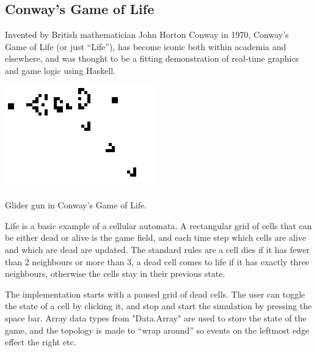 \subsection{Conway's Game of Life}

Invented by British mathematician John Horton Conway in 1970, Conway's Game of Life (or just ``Life''), has become iconic both within academia and elsewhere, and was thought to be a fitting demonstration of real-time graphics and game logic using Haskell. 

\begin{marginfigure}
	\includegraphics{res/conway/conway.png}
	\caption[Glider gun in Conway's Game of Life]{Glider gun in Conway's Game of Life.}
	\label{fig:glidergun}
\end{marginfigure}

Life is a basic example of a cellular automata. A rectangular grid of cells that can be either dead or alive is the game field, and each time step which cells are alive and which are dead are updated. The standard rules are a cell dies if it has fewer than 2 neighbours or more than 3, a dead cell comes to life if it has exactly three neighbours, otherwise the cells stay in their previous state.

The implementation starts with a paused grid of dead cells. The user can toggle the state of a cell by clicking it, and stop and start the simulation by pressing the space bar. Array data types from "Data.Array" are used to store the state of the game, and the topology is made to ``wrap around'' so events on the leftmost edge effect the right etc.